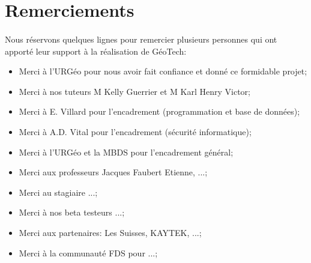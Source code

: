 \section{Remerciements}
\paragraph{}
Nous réservons quelques lignes pour remercier plusieurs personnes qui ont apporté leur support à la réalisation de GéoTech:\par



\begin{itemize}
    \item Merci à l'URGéo pour nous avoir fait confiance et donné ce formidable projet;\par
    \item Merci à nos tuteurs M Kelly Guerrier et M Karl Henry Victor;\par
    \item   Merci à  E. Villard pour l'encadrement (programmation et base de données);\par
    \item   Merci à A.D. Vital pour l'encadrement (sécurité informatique);\par
    \item   Merci à l'URGéo et la MBDS pour l'encadrement général;\par
    \item   Merci aux professeurs Jacques Faubert Etienne, ...;\par
    \item   Merci au stagiaire ...;\par
    \item   Merci à nos beta testeurs ...;\par
    \item   Merci aux partenaires: Les Suisses, KAYTEK, ...;\par
    \item  Merci à la communauté FDS pour ...;\par
\end{itemize}
